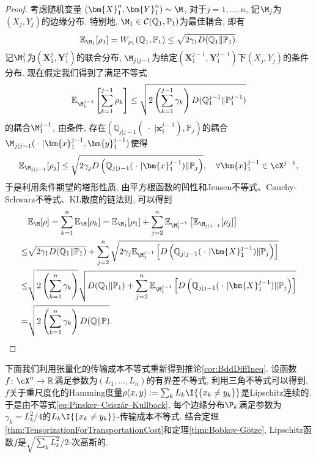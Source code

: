 \begin{proof}
	考虑随机变量 $(\bm{X}_1^n, \bm{Y}_1^n) \sim \M$, 对于$j = 1, \dots, n$, 记$\M_j$为$(X_j, Y_j)$的边缘分布. 
	特别地, $\M_1 \in \mathcal{C}(\mathbb{Q}_1, \mathbb{P}_1)$为最佳耦合, 即有
	\begin{equation*}
		\mathbb{E}_{\M_1} [\rho_1] = W_{\rho_1} (\mathbb{Q}_1, \mathbb{P}_1) \leq \sqrt{2 \gamma_1 D(\mathbb{Q}_1 \| \mathbb{P}_1)}. 
	\end{equation*}
	记$\M_1^j$为$(\bm{X}_1^j, \bm{Y}_1^j)$的联合分布, $\M_{j | j-1}$为给定$(\bm{X}_1^{j-1}, \bm{Y}_1^{j-1})$下$(X_j, Y_j)$的条件分布. 
	现在假定我们得到了满足不等式
	\begin{equation*}
		\mathbb{E}_{\M_1^{j-1}} \left[\sum_{k=1}^{j-1} \rho_k \right]
		\leq \sqrt{2 \left(\sum_{k=1}^{j-1} \gamma_k \right) D(\mathbb{Q}_1^{j-1} \| \mathbb{P}_1^{j-1})}
	\end{equation*}
	的耦合$\M_1^{j-1}$, 由条件, 存在$\left(\mathbb{Q}_{j | j-1}(\;\cdot\; | \bm{x}_1^{j-1}), \mathbb{P}_j\right)$的耦合$\M_{j | j-1}(\;\cdot\; | \bm{x}_1^{j-1}, \bm{y}_1^{j-1})$使得
	\begin{equation*}
		\mathbb{E}_{\M_{j | j-1}}[ \rho_j] 
		\leq \sqrt{2 \gamma_j D\left(\mathbb{Q}_{j | j-1}(\;\cdot\; | \bm{x}_1^{j-1}) \| \mathbb{P}_j\right)}, 
		\quad \forall \bm{x}_1^{j-1} \in \cX^{j-1}, 
	\end{equation*}
	于是利用条件期望的塔形性质, 由平方根函数的凹性和Jensen不等式、Cauchy-Schwarz不等式、KL散度的链法则, 可以得到
	\begin{align*}
		& \mathbb{E}_{\M}[\rho]
		= \sum_{k=1}^n \mathbb{E}_{\M}[ \rho_k]
		= \mathbb{E}_{\M_1}[\rho_1] + \sum_{j=2}^n \mathbb{E}_{\M_1^{j-1}} \left[ \mathbb{E}_{\M_{j | j-1}} [\rho_j] \right] \\
		\leq & \sqrt{2 \gamma_1 D(\mathbb{Q}_1 \| \mathbb{P}_1)} + \sum_{j=2}^n \sqrt{2 \gamma_j \mathbb{E}_{\M_1^{j-1}} \left[ D\left(\mathbb{Q}_{j | j-1}(\;\cdot\; | \bm{X}_1^{j-1}) \| \mathbb{P}_j\right) \right]} \\
		\leq & \sqrt{2 \left(\sum_{k=1}^n \gamma_k \right)} \sqrt{D(\mathbb{Q}_1 \| \mathbb{P}_1) + \sum_{j=2}^n \mathbb{E}_{\M_1^{j-1}} \left[ D\left(\mathbb{Q}_{j | j-1}(\;\cdot\; | \bm{X}_1^{j-1}) \| \mathbb{P}_j\right) \right]} \\
		= & \sqrt{2 \left(\sum_{k=1}^n \gamma_k \right) D(\mathbb{Q} \| \mathbb{P})}. 
	\end{align*}
\end{proof}

 
\begin{example}[有界差不等式']
	下面我们利用张量化的传输成本不等式重新得到推论\ref{cor:BddDiffIneq}.
	设函数$f \colon \cX^n \to \mathbb{R}$满足参数为$(L_1, \dots, L_n)$的有界差不等式, 利用三角不等式可以得到, $f$关于重尺度化的Hamming度量$\rho(x, y) := \sum_k L_k \I{\{x_k \neq y_k\}}$是Lipschitz连续的. 
	于是由不等式\ref{eq:Pinsker–Csiszár–Kullback}, 每个边缘分布$\P_k$满足参数为$\gamma_k = L_k^2 / 4$的$L_k \I{\{x_k \neq y_k\}}$-传输成本不等式. 
	结合定理\ref{thm:TensorizationForTransportationCost}和定理\ref{thm:Bobkov-Götze}, Lipschitz函数$f$是$\sqrt{\sum_k L_k^2} / 2$-次高斯的. 
\end{example}


